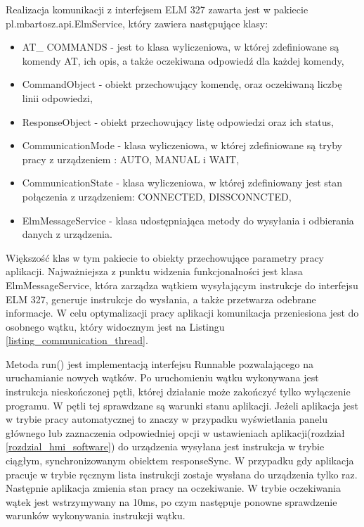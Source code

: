 \documentclass[12pt, twoside]{article} %
\numberwithin{equation}{subsection}
\numberwithin{figure}{section}
\numberwithin{table}{section}
\begin{document}
	
	
	\newpage
	
	Realizacja komunikacji z interfejsem ELM 327 zawarta jest w pakiecie pl.mbartosz.api.ElmService, który zawiera następujące klasy:
	
	\begin{itemize}
		\item{AT\_ COMMANDS - jest to klasa wyliczeniowa, w której zdefiniowane są komendy AT, ich opis, a także oczekiwana odpowiedź dla każdej komendy,}
		\item{CommandObject - obiekt przechowujący komendę, oraz oczekiwaną liczbę linii odpowiedzi,}
		\item{ResponseObject - obiekt przechowujący listę odpowiedzi oraz ich status,}
		\item{CommunicationMode - klasa wyliczeniowa, w której zdefiniowane są tryby pracy z urządzeniem : AUTO, MANUAL i WAIT,}
		\item{CommunicationState - klasa wyliczeniowa, w której zdefiniowany jest stan połączenia z urządzeniem: CONNECTED, DISSCONNCTED,}
		\item{ElmMessageService - klasa udostępniająca metody do wysyłania i odbierania danych z urządzenia.}
	\end{itemize}
	
	Większość klas w tym pakiecie to obiekty przechowujące parametry pracy aplikacji. Najważniejsza z punktu widzenia funkcjonalności jest klasa ElmMessageService, która zarządza wątkiem wysyłającym instrukcje do interfejsu ELM 327, generuje instrukcje do wysłania, a także przetwarza odebrane informacje. W celu optymalizacji pracy aplikacji komunikacja przeniesiona jest do osobnego wątku, który widocznym jest na Listingu \ref{listing_communication_thread}. \\
	
	
	
	
	\newpage
	
	Metoda run() jest implementacją interfejsu Runnable pozwalającego na uruchamianie nowych wątków. Po uruchomieniu wątku wykonywana jest instrukcja nieskończonej pętli, której działanie może zakończyć tylko wyłączenie programu. W pętli tej sprawdzane są warunki stanu aplikacji. Jeżeli aplikacja jest w trybie pracy automatycznej to znaczy w przypadku wyświetlania panelu głównego lub zaznaczenia odpowiedniej opcji w ustawieniach aplikacji(rozdział \ref{rozdzial_hmi_software}) do urządzenia wysyłana jest instrukcja w trybie ciągłym, synchronizowanym obiektem responseSync. W przypadku gdy aplikacja pracuje w trybie ręcznym lista instrukcji zostaje wysłana do urządzenia tylko raz. Następnie aplikacja zmienia stan pracy na oczekiwanie. W trybie oczekiwania wątek jest wstrzymywany na 10ms, po czym następuje ponowne sprawdzenie warunków wykonywania instrukcji \mbox{wątku}. 
	
\end{document}
